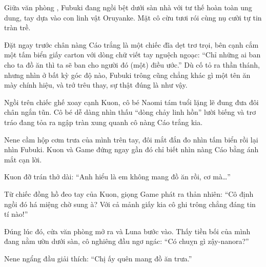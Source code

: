 \documentclass[../main.tex]{subfiles}
\begin{document}

Giữa văn phòng \hll, Fubuki đang ngồi bệt dưới sàn nhà với tư thế hoàn toàn ung dung, tay dựa vào con linh vật Oruyanke. Mặt cô cừu tươi rói cùng nụ cười tự tin tràn trề.

Đặt ngay trước chân nàng Cáo trắng là một chiếc đĩa dẹt trơ trọi, bên cạnh cắm một tấm biển giấy carton với dòng chữ viết tay nguệch ngoạc: ``Chỉ những ai ban cho ta đồ ăn thì ta sẽ ban cho người đó (một) điều ước.'' Dù cố tỏ ra thần thánh, nhưng nhìn ở bất kỳ góc độ nào, Fubuki trông cũng chẳng khác gì một tên ăn mày chính hiệu, và trớ trêu thay, sự thật đúng là như vậy.


Ngồi trên chiếc ghế xoay cạnh Kuon, cô bé Naomi tám tuổi lặng lẽ đung đưa đôi chân ngắn tũn. Cô bé dễ dàng nhìn thấu ``dòng chảy linh hồn'' lười biếng và trơ tráo đang tỏa ra ngập tràn xung quanh cô nàng Cáo trắng kia.

Nene cầm hộp cơm trưa của mình trên tay, đôi mắt đắn đo nhìn tấm biển rồi lại nhìn Fubuki. Kuon và Game đứng ngay gần đó chỉ biết nhìn nàng Cáo bằng ánh mắt cạn lời.

Kuon đỡ trán thở dài: ``Anh hiểu là em không mang đồ ăn rồi, cơ mà\dots''

Từ chiếc đồng hồ đeo tay của Kuon, giọng Game phát ra thản nhiên: ``Cô định ngồi đó há miệng chờ sung à? Với cả mảnh giấy kia cô ghi trông chẳng đáng tin tí nào!''

Đúng lúc đó, cửa văn phòng mở ra và Luna bước vào. Thấy tiền bối của mình đang nằm ườn dưới sàn, cô nghiêng đầu ngơ ngác: ``Có chuỵn gì zậy-nanora?''

Nene ngẩng đầu giải thích: ``Chị ấy quên mang đồ ăn trưa.''
\end{document}
